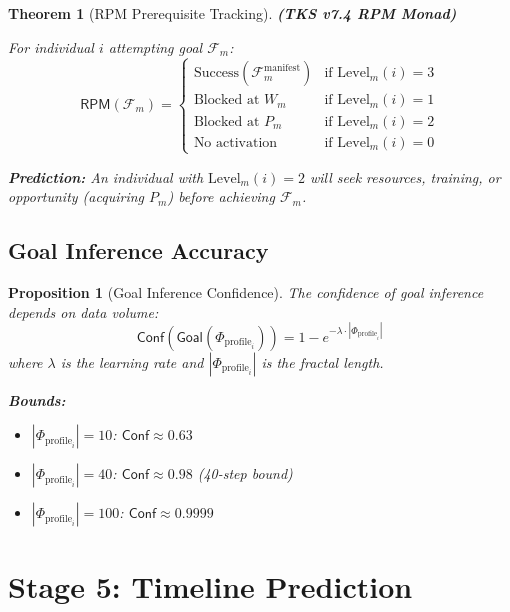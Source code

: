 \documentclass[11pt,twoside]{book}
\newcommand{\Foundations}{\mathcal{F}}
\newcommand{\RPM}{\mathsf{RPM}}
\newcommand{\ProfileFrac}{\Phi_{\mathrm{profile}}}
\newtheorem{theorem}{Theorem}[chapter]
\newtheorem{proposition}{Proposition}[chapter]
\begin{document}
\begin{theorem}[RPM Prerequisite Tracking]
\label{thm:rpm-prereq}
\textbf{(TKS v7.4 RPM Monad)}

For individual $i$ attempting goal $\Foundations_m$:
\[
    \RPM(\Foundations_m) =
    \begin{cases}
        \text{Success}(\Foundations_m^{\text{manifest}}) & \text{if } \mathrm{Level}_m(i) = 3 \\
        \text{Blocked at } W_m & \text{if } \mathrm{Level}_m(i) = 1 \\
        \text{Blocked at } P_m & \text{if } \mathrm{Level}_m(i) = 2 \\
        \text{No activation} & \text{if } \mathrm{Level}_m(i) = 0
    \end{cases}
\]

\textbf{Prediction:} An individual with $\mathrm{Level}_m(i) = 2$ will seek resources, training, or opportunity (acquiring $P_m$) before achieving $\Foundations_m$.
\end{theorem}

\section{Goal Inference Accuracy}

\begin{proposition}[Goal Inference Confidence]
\label{prop:goal-confidence}
The confidence of goal inference depends on data volume:
\[
    \mathsf{Conf}(\mathsf{Goal}(\ProfileFrac_i)) = 1 - e^{-\lambda \cdot |\ProfileFrac_i|}
\]
where $\lambda$ is the learning rate and $|\ProfileFrac_i|$ is the fractal length.

\textbf{Bounds:}
\begin{itemize}
    \item $|\ProfileFrac_i| = 10$: $\mathsf{Conf} \approx 0.63$
    \item $|\ProfileFrac_i| = 40$: $\mathsf{Conf} \approx 0.98$ (40-step bound)
    \item $|\ProfileFrac_i| = 100$: $\mathsf{Conf} \approx 0.9999$
\end{itemize}
\end{proposition}

\chapter{Stage 5: Timeline Prediction}
\label{ch:stage5-timeline}
\end{document}
